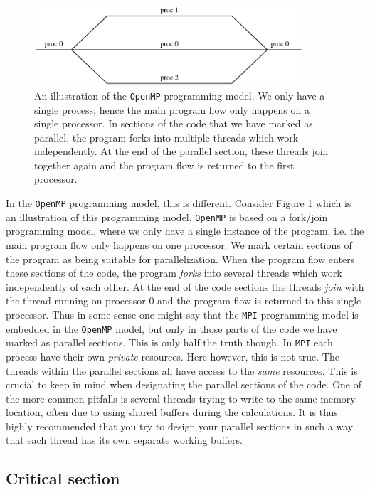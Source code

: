 \documentclass[twoside, 11pt, a4paper]{article}
\begin{document}
\begin{figure}[ht]
	\begin{center}
		\includegraphics[width=10cm]{openmp}
	\end{center}
	\caption{An illustration of the \texttt{OpenMP} programming model. We only have a single
			 process, hence the main program flow only happens on a single processor.
			 In sections of the code that we have marked as parallel, the
			 program forks into multiple threads which work independently. At the end
			 of the parallel section, these threads join together again and the
			 program flow is returned to the first processor.}
	\label{fig:openmp}
\end{figure}
In the \texttt{OpenMP} programming model, this is different. Consider Figure \ref{fig:openmp}
which is an illustration of this programming model. \texttt{OpenMP} is based on a fork/join
programming model, where we only have a single instance of the program, i.e.
the main program flow only happens on one processor. We mark certain
sections of the program as being suitable for parallelization. When the program flow
enters these sections of the code, the program \emph{forks} into several threads which work
independently of each other. At the end of the code sections the threads \emph{join}
with the thread running on processor 0 and the program flow is returned to this single
processor. Thus in some sense one might say that the \texttt{MPI} programming model is embedded
in the \texttt{OpenMP} model, but only in those parts of the code we have marked as parallel sections. 
This is only half the truth though. In \texttt{MPI} each process have their own \emph{private} resources.
Here however, this is not true. The threads within the parallel sections all have access
to the \emph{same} resources. This is crucial to keep in mind when designating the parallel
sections of the code. One of the more common pitfalls is several threads trying to write to 
the same memory location, often due to using shared buffers during the calculations.
It is thus highly recommended that you try to design your parallel sections in such a way
that each thread has its own separate working buffers.

\subsection{Critical section}
\label{sec:critsec}
\end{document}
